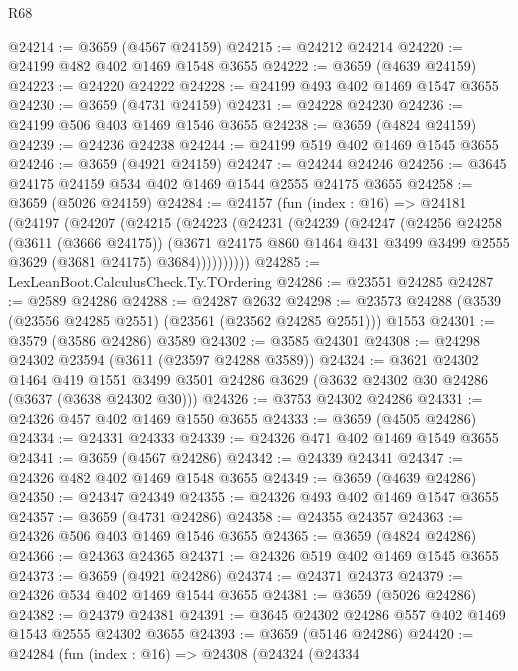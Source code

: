 \begin{lexlean}{R68}
\begin{coremodule}
@24214 := @3659 (@4567 @24159)
@24215 := @24212 @24214
@24220 := @24199 @482 @402 @1469 @1548 @3655
@24222 := @3659 (@4639 @24159)
@24223 := @24220 @24222
@24228 := @24199 @493 @402 @1469 @1547 @3655
@24230 := @3659 (@4731 @24159)
@24231 := @24228 @24230
@24236 := @24199 @506 @403 @1469 @1546 @3655
@24238 := @3659 (@4824 @24159)
@24239 := @24236 @24238
@24244 := @24199 @519 @402 @1469 @1545 @3655
@24246 := @3659 (@4921 @24159)
@24247 := @24244 @24246
@24256 := @3645 @24175 @24159 @534 @402 @1469 @1544 @2555 @24175 @3655
@24258 := @3659 (@5026 @24159)
@24284 := @24157
    (fun (index : @16) =>
    @24181
      (@24197
        (@24207
          (@24215
            (@24223
              (@24231
                (@24239
                  (@24247
                    (@24256
                      @24258
                      (@3611 (@3666 @24175))
                      (@3671
                        @24175
                        @860
                        @1464
                        @431
                        @3499
                        @3499
                        @2555
                        @3629
                        (@3681 @24175)
                        @3684))))))))))
@24285 := LexLeanBoot.CalculusCheck.Ty.TOrdering
@24286 := @23551 @24285
@24287 := @2589 @24286
@24288 := @24287 @2632
@24298 := @23573 @24288 (@3539 (@23556 @24285 @2551) (@23561 (@23562 @24285 @2551))) @1553
@24301 := @3579 (@3586 @24286) @3589
@24302 := @3585 @24301
@24308 := @24298 @24302 @23594 (@3611 (@23597 @24288 @3589))
@24324 := @3621
    @24302
    @1464
    @419
    @1551
    @3499
    @3501
    @24286
    @3629
    (@3632 @24302 @30 @24286 (@3637 (@3638 @24302 @30)))
@24326 := @3753 @24302 @24286
@24331 := @24326 @457 @402 @1469 @1550 @3655
@24333 := @3659 (@4505 @24286)
@24334 := @24331 @24333
@24339 := @24326 @471 @402 @1469 @1549 @3655
@24341 := @3659 (@4567 @24286)
@24342 := @24339 @24341
@24347 := @24326 @482 @402 @1469 @1548 @3655
@24349 := @3659 (@4639 @24286)
@24350 := @24347 @24349
@24355 := @24326 @493 @402 @1469 @1547 @3655
@24357 := @3659 (@4731 @24286)
@24358 := @24355 @24357
@24363 := @24326 @506 @403 @1469 @1546 @3655
@24365 := @3659 (@4824 @24286)
@24366 := @24363 @24365
@24371 := @24326 @519 @402 @1469 @1545 @3655
@24373 := @3659 (@4921 @24286)
@24374 := @24371 @24373
@24379 := @24326 @534 @402 @1469 @1544 @3655
@24381 := @3659 (@5026 @24286)
@24382 := @24379 @24381
@24391 := @3645 @24302 @24286 @557 @402 @1469 @1543 @2555 @24302 @3655
@24393 := @3659 (@5146 @24286)
@24420 := @24284
    (fun (index : @16) =>
    @24308
      (@24324
        (@24334

\end{coremodule}
\end{lexlean}
